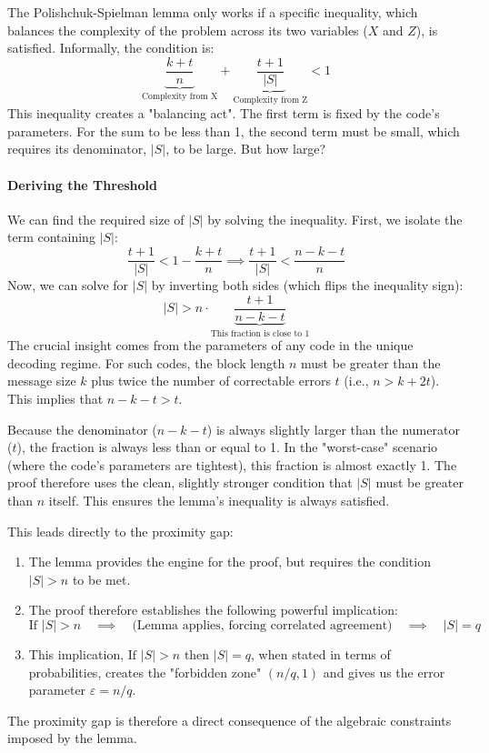 \documentclass{article}
\begin{document}
\begin{tcolorbox}[breakable, title={The Lemma's Condition and the Origin of the Gap}]
The Polishchuk-Spielman lemma only works if a specific inequality, which balances the complexity of the problem across its two variables ($X$ and $Z$), is satisfied. Informally, the condition is:
\[ \underbrace{\frac{k+t}{n}}_{\text{Complexity from X}} + \underbrace{\frac{t+1}{|S|}}_{\text{Complexity from Z}} < 1 \]
This inequality creates a "balancing act". The first term is fixed by the code's parameters. For the sum to be less than 1, the second term must be small, which requires its denominator, $|S|$, to be large. But how large?

\paragraph{Deriving the Threshold}
We can find the required size of $|S|$ by solving the inequality. First, we isolate the term containing $|S|$:
\[ \frac{t+1}{|S|} < 1 - \frac{k+t}{n} \implies \frac{t+1}{|S|} < \frac{n - k - t}{n} \]
Now, we can solve for $|S|$ by inverting both sides (which flips the inequality sign):
\[ |S| > n \cdot \underbrace{\frac{t+1}{n-k-t}}_{\text{This fraction is close to 1}} \]
The crucial insight comes from the parameters of any code in the unique decoding regime. For such codes, the block length $n$ must be greater than the message size $k$ plus twice the number of correctable errors $t$ (i.e., $n > k+2t$). This implies that $n-k-t > t$.

Because the denominator ($n-k-t$) is always slightly larger than the numerator ($t$), the fraction is always less than or equal to 1. In the "worst-case" scenario (where the code's parameters are tightest), this fraction is almost exactly 1. The proof therefore uses the clean, slightly stronger condition that $|S|$ must be greater than $n$ itself. This ensures the lemma's inequality is always satisfied.

This leads directly to the proximity gap:
\begin{enumerate}
    \item The lemma provides the engine for the proof, but requires the condition $|S| > n$ to be met.
    \item The proof therefore establishes the following powerful implication:
    \[ \text{If } |S| > n \quad \implies \quad \text{(Lemma applies, forcing correlated agreement)} \quad \implies \quad |S| = q \]
    \item This implication, $\text{If } |S|>n \text{ then } |S|=q$, when stated in terms of probabilities, creates the "forbidden zone" $(n/q, 1)$ and gives us the error parameter $\varepsilon = n/q$.
\end{enumerate}
The proximity gap is therefore a direct consequence of the algebraic constraints imposed by the lemma.
\end{tcolorbox}
\end{document}

